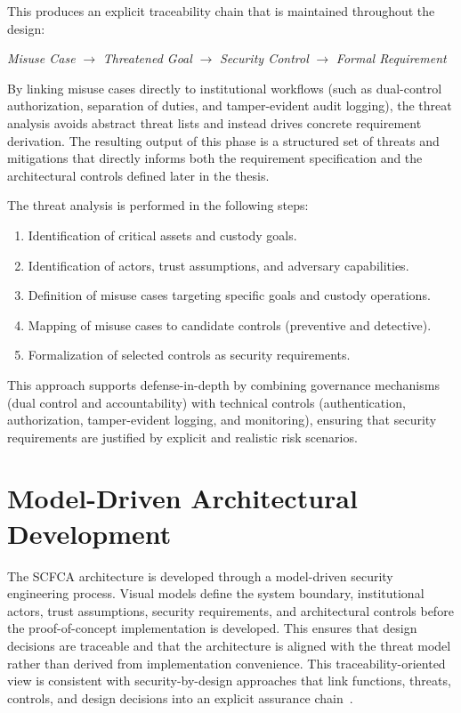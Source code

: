 \documentclass[12pt,a4paper]{report}
\begin{document}
This produces an explicit traceability chain that is maintained throughout the design:

\begin{center}
\textit{Misuse Case} $\rightarrow$ \textit{Threatened Goal} $\rightarrow$ \textit{Security Control} $\rightarrow$ \textit{Formal Requirement}
\end{center}

By linking misuse cases directly to institutional workflows (such as dual-control authorization, separation of duties, and tamper-evident audit logging), the threat analysis avoids abstract threat lists and instead drives concrete requirement derivation. The resulting output of this phase is a structured set of threats and mitigations that directly informs both the requirement specification and the architectural controls defined later in the thesis.

The threat analysis is performed in the following steps:

\begin{enumerate}
    \item Identification of critical assets and custody goals.
    \item Identification of actors, trust assumptions, and adversary capabilities.
    \item Definition of misuse cases targeting specific goals and custody operations.
    \item Mapping of misuse cases to candidate controls (preventive and detective).
    \item Formalization of selected controls as security requirements.
\end{enumerate}

This approach supports defense-in-depth by combining governance mechanisms (dual control and accountability) with technical controls (authentication, authorization, tamper-evident logging, and monitoring), ensuring that security requirements are justified by explicit and realistic risk scenarios.

\section{Model-Driven Architectural Development}

The SCFCA architecture is developed through a model-driven security engineering process. Visual models define the system boundary, institutional actors, trust assumptions, security requirements, and architectural controls before the proof-of-concept implementation is developed. This ensures that design decisions are traceable and that the architecture is aligned with the threat model rather than derived from implementation convenience.
This traceability-oriented view is consistent with security-by-design approaches that link functions, threats, controls, and design decisions into an explicit assurance chain~\cite{Fluchs2021}.
\end{document}
